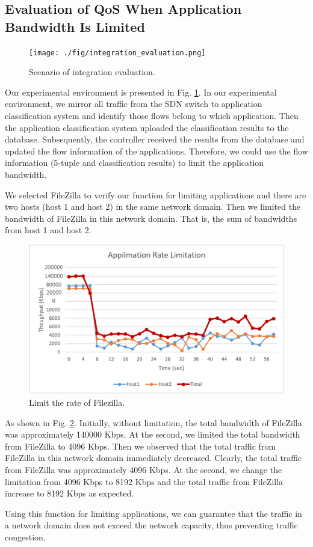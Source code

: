 \subsection{Evaluation of QoS When Application Bandwidth Is Limited}

\begin{figure}[!t]
\centering
\texttt{[image: ./fig/integration\_evaluation.png]}
\caption{Scenario of integration evaluation.}
\label{fig:integration_evaluation}
\end{figure}


Our experimental environment is presented in Fig. \ref{fig:integration_evaluation}. In our experimental environment, we mirror all traffic from the SDN switch to application classification system and identify those flows belong to which application.
Then the application classification system uploaded the classification results to the database.
Subsequently, the controller received the results from the database and updated the flow information of the applications.
Therefore, we could use the flow information (5-tuple and classification results) to limit the application bandwidth.

We selected FileZilla to verify our function for limiting applications and there are two hosts (host 1 and host 2) in the same network domain.
Then we limited the bandwidth of FileZilla in this network domain. That is, the sum of bandwidths from host 1 and host 2.

\begin{figure}[!t]
\centering
\includegraphics[width=\textwidth]{./fig/integration_app_filezilla.png}
\caption{Limit the rate of Filezilla.}
\label{fig:integration_app_filezilla}
\end{figure}

As shown in Fig. \ref{fig:integration_app_filezilla}.
Initially, without limitation, the total bandwidth of FileZilla was approximately 140000 Kbps.
At the  second, we limited the total bandwidth from FileZilla to 4096 Kbps.
Then we observed that the total traffic from FileZilla in this network domain immediately decreased.
Clearly, the total traffic from FileZilla was approximately 4096 Kbps.
At the  second, we change the limitation from 4096 Kbps to 8192 Kbps and the total traffic from FileZilla increase to 8192 Kbps as expected.

Using this function for limiting applications, we can guarantee that the traffic in a network domain does not exceed the network capacity, thus preventing traffic congestion.

